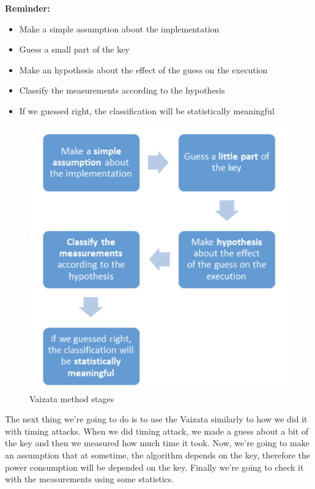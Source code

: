 \textbf{Reminder:}
	
\begin{itemize}
\item Make a {simple assumption} about the implementation
\item Guess a {small part} of the key
\item Make an {hypothesis} about the effect of the guess on the execution
\item {Classify the measurements} according to the hypothesis
\item If we guessed right, the classification will be {statistically meaningful}
\end{itemize}


\begin{figure}[!ht]
    \centering
    \includegraphics[height=0.9\textwidth]{images/Lecture6/vaizata.png}
    \caption{Vaizata method stages} \label{fig:vaizata}
\end{figure}

The next thing we're going to do is to use the Vaizata similarly to how we did
it with timing attacks. When we did timing attack, we made a guess about a bit
of the key and then we measured how much time it took. Now, we're going to make
an assumption that at sometime, the algorithm depends on the key, therefore the
power consumption will be depended on the key. Finally we're going to check it
with the measurements using some statistics. 


